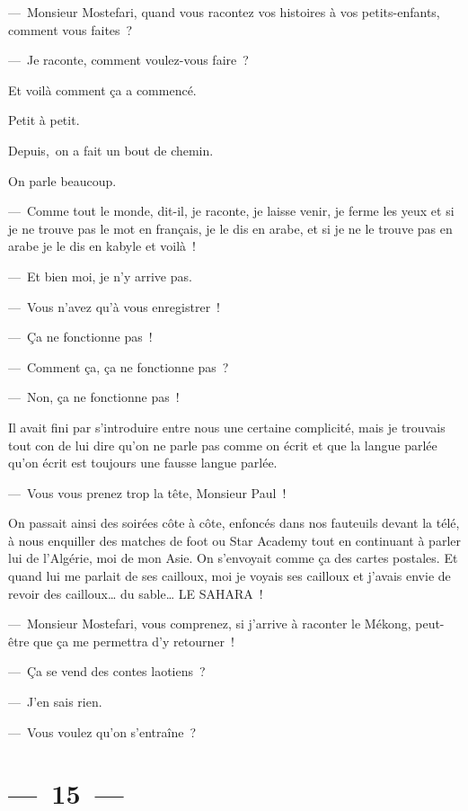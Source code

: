 \documentclass[twoside]{book} %
\begin{document}
— Monsieur Mostefari, quand vous racontez vos histoires à vos petits-enfants, comment vous faites ?\par
— Je raconte, comment voulez-vous faire ?\par
Et voilà comment ça a commencé.\par
Petit à petit.\par
Depuis, on a fait un bout de chemin.\par
On parle beaucoup.\par
— Comme tout le monde, dit-il, je raconte, je laisse venir, je ferme les yeux et si je ne trouve pas le mot en français, je le dis en arabe, et si je ne le trouve pas en arabe je le dis en kabyle et voilà !\par
— Et bien moi, je n’y arrive pas.\par
— Vous n’avez qu’à vous enregistrer !\par
— Ça ne fonctionne pas !\par
— Comment ça, ça ne fonctionne pas ?\par
— Non, ça ne fonctionne pas !\par
Il avait fini par s’introduire entre nous une certaine complicité, mais je trouvais tout con de lui dire qu’on ne parle pas comme on écrit et que la langue parlée qu’on écrit est toujours une fausse langue parlée.\par
— Vous vous prenez trop la tête, Monsieur Paul !\par
On passait ainsi des soirées côte à côte, enfoncés dans nos fauteuils devant la télé, à nous enquiller des matches de foot ou Star Academy tout en continuant à parler lui de l’Algérie, moi de mon Asie. On s’envoyait comme ça des cartes postales. Et quand lui me parlait de ses cailloux, moi je voyais ses cailloux et j’avais envie de revoir des cailloux… du sable… LE SAHARA !\par
— Monsieur Mostefari, vous comprenez, si j’arrive à raconter le Mékong, peut-être que ça me permettra d’y retourner !\par
— Ça se vend des contes laotiens ?\par
— J’en sais rien.\par
— Vous voulez qu’on s’entraîne ?

\section[{— 15 —}]{— 15 —}
\renewcommand{\leftmark}{— 15 —}
\end{document}
